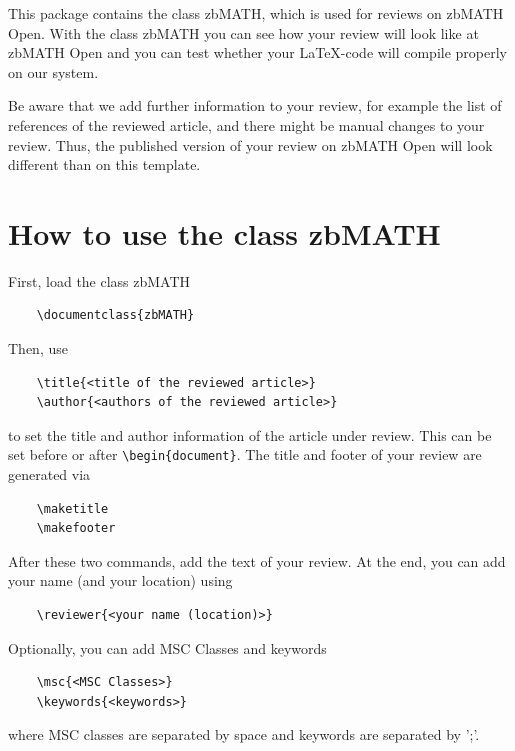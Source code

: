 \documentclass{zbMATH}
\begin{document}
\makefooter



\vspace{4ex}

This package contains the class zbMATH, which is used for reviews on zbMATH Open.
With the class zbMATH you can see how your review will look like at zbMATH Open and you can test whether your LaTeX-code will compile properly on our system. 

Be aware that we add further information to your review, for example the list of references of the reviewed article, and there might be manual changes to your review. Thus, the published version of your review on zbMATH Open will look different than on this template. 

\section*{How to use the class zbMATH}

First, load the class zbMATH
\begin{verbatim}
    \documentclass{zbMATH}
\end{verbatim}

Then, use
\begin{verbatim}
    \title{<title of the reviewed article>}
    \author{<authors of the reviewed article>}
\end{verbatim}
to set the title and author information of the article under review. This can be set before or after \verb|\begin{document}|. The title and footer of your review are generated via
\begin{verbatim}
    \maketitle
    \makefooter
\end{verbatim}
After these two commands, add the text of your review. At the end, you can add your name (and your location) using
\begin{verbatim}
    \reviewer{<your name (location)>}
\end{verbatim}
Optionally, you can add MSC Classes and keywords
\begin{verbatim}
    \msc{<MSC Classes>}
    \keywords{<keywords>}
\end{verbatim}
where MSC classes are separated by space and keywords are separated by ';'.
\end{document}
